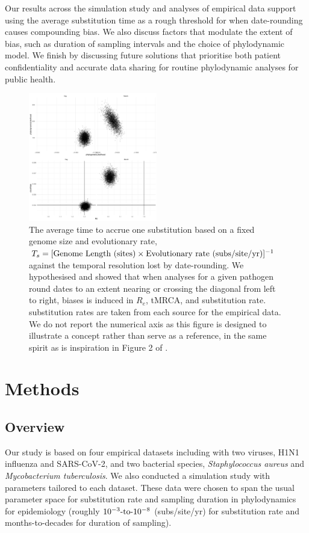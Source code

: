\documentclass[12pt]{article}
\begin{document}
\begin{spacing}{2}
 Our results across the simulation study and analyses of empirical data support using the average substitution time as a rough threshold for when date-rounding causes compounding bias. We also discuss factors that modulate the extent of bias, such as duration of sampling intervals and the choice of phylodynamic model. We finish by discussing future solutions that prioritise both patient confidentiality and accurate data sharing for routine phylodynamic analyses for public health.

\begin{figure}[H]
    \centering
    \includegraphics[width = 0.5\textwidth]{plane.pdf}
    \caption{The average time to accrue one substitution based on a fixed genome size and evolutionary rate, $T_s = [\textnormal{Genome Length (sites)}\times\textnormal{Evolutionary rate (subs/site/yr)}]^{-1}$ against the temporal resolution lost by date-rounding. We hypothesised and showed that when analyses for a given pathogen round dates to an extent nearing or crossing the diagonal from left to right, biases is induced in $R_e$, tMRCA, and substitution rate. substitution rates are taken from each source for the empirical data. We do not report the numerical axis as this figure is designed to illustrate a concept rather than serve as a reference, in the same spirit as is inspiration in Figure 2 of \citet{biek_measurably_2015}.}
    \label{fig:plane}
\end{figure}

\section*{Methods}
\subsection*{Overview}
Our study is based on four empirical datasets including with two viruses, H1N1 influenza and SARS-CoV-2, and two bacterial species, \textit{Staphylococcus aureus} and \textit{Mycobacterium tuberculosis}. We also conducted a  simulation study with parameters tailored to each dataset. These data were chosen to span the usual parameter space for substitution rate and sampling duration in phylodynamics for epidemiology (roughly $10^{-3}\textnormal{-to-}10^{-8}$ (subs/site/yr) for substitution rate and months-to-decades for duration of sampling).


\end{spacing}
\end{document}
